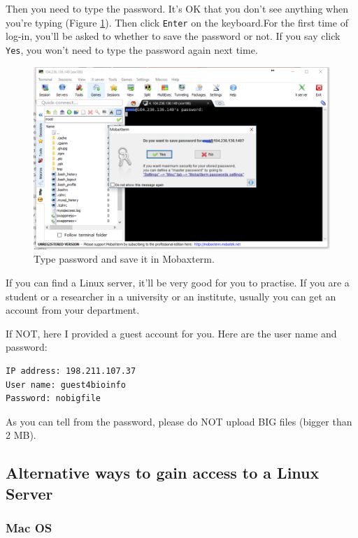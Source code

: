 \documentclass[]{book}
\begin{document}
Then you need to type the password. It's OK that you don't see anything when you're typing (Figure \ref{fig:mobaxtermSavepswd}). Then click \texttt{Enter} on the keyboard.For the first time of log-in, you'll be asked to whether to save the password or not. If you say click \texttt{Yes}, you won't need to type the password again next time.



\begin{figure}
\centering
\includegraphics{figures/mobaxterm_savepassword.png}
\caption{\label{fig:mobaxtermSavepswd}Type password and save it in Mobaxterm.}
\end{figure}

If you can find a Linux server, it'll be very good for you to practise. If you are a student or a researcher in a university or an institute, usually you can get an account from your department.

If NOT, here I provided a guest account for you. Here are the user name and password:

\begin{verbatim}
IP address: 198.211.107.37
User name: guest4bioinfo
Password: nobigfile
\end{verbatim}

As you can tell from the password, please do NOT upload BIG files (bigger than 2 MB).

\hypertarget{alternative-ways-to-gain-access-to-a-linux-server}{%
\subsection{Alternative ways to gain access to a Linux Server}\label{alternative-ways-to-gain-access-to-a-linux-server}}

\hypertarget{mac-os}{%
\subsubsection{Mac OS}\label{mac-os}}
\end{document}

